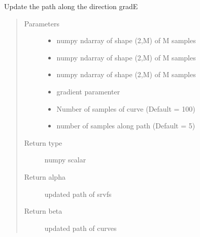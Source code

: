 \documentclass[letterpaper,10pt,english]{sphinxmanual}
\begin{document}
\begin{fulllineitems}
\label{\detokenize{geodesic:geodesic.update_path}}
Update the path along the direction \sphinxhyphen{}gradE
\begin{quote}\begin{description}
\item[{Parameters}] \leavevmode\begin{itemize}
\item {} 
 \textendash{} numpy ndarray of shape (2,M) of M samples

\item {} 
 \textendash{} numpy ndarray of shape (2,M) of M samples

\item {} 
 \textendash{} numpy ndarray of shape (2,M) of M samples

\item {} 
 \textendash{} gradient paramenter

\item {} 
 \textendash{} Number of samples of curve (Default = 100)

\item {} 
 \textendash{} number of samples along path (Default = 5)

\end{itemize}

\item[{Return type}] \leavevmode
numpy scalar

\item[{Return alpha}] \leavevmode
updated path of srvfs

\item[{Return beta}] \leavevmode
updated path of curves

\end{description}\end{quote}

\end{fulllineitems}
\end{document}
